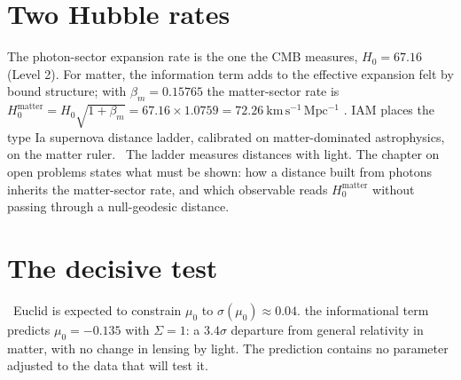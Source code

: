 \section{Two Hubble rates}

The photon-sector expansion rate is the one the CMB measures, $H_0=67.16$ (Level 2). For matter, the information term adds to the
effective expansion felt by bound structure; with $\beta_m=0.15765$ the matter-sector rate is $H_0^{\mathrm{matter}}=H_0\sqrt{1+\beta_m}=67.16\times1.0759=72.26\ \mathrm{km\,s^{-1}\,Mpc^{-1}}$ \derived.
IAM places the type Ia supernova distance ladder, calibrated on matter-dominated astrophysics, on the matter ruler.
\openprob\ The ladder measures distances with light. The chapter on open problems states what must be shown: how a distance built from photons
inherits the matter-sector rate, and which observable reads $H_0^{\mathrm{matter}}$ without passing through a null-geodesic distance.

\section{The decisive test}

\prediction\ Euclid is expected to constrain $\mu_0$ to $\sigma(\mu_0)\approx0.04$. the informational term predicts $\mu_0=-0.135$ with $\Sigma=1$:
a $3.4\sigma$ departure from general relativity in matter, with no change in lensing by light.
The prediction contains no parameter adjusted to the data that will test it.
